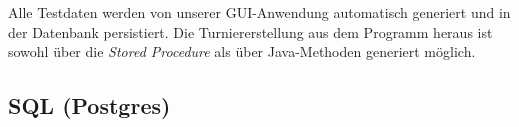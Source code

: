 \documentclass[11pt,german]{scrartcl}
\begin{document}
Alle Testdaten werden von unserer GUI-Anwendung automatisch generiert und in der Datenbank persistiert. Die Turniererstellung  aus dem Programm heraus ist sowohl über die \emph{Stored Procedure} als über Java-Methoden generiert möglich.

\subsection*{SQL (Postgres)}



%
\end{document}
